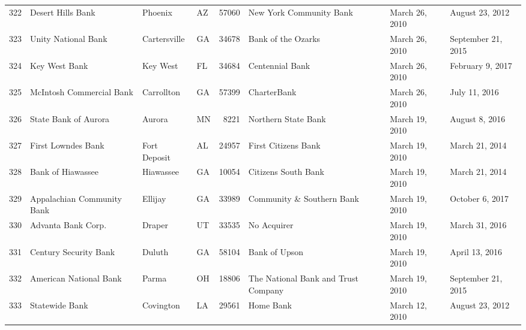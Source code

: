 \begin{tabular}{llllrlll}
322 &                                  Desert Hills Bank &             Phoenix &  AZ &  57060 &                            New York Community Bank &      March 26, 2010 &     August 23, 2012 \\
323 &                                Unity National Bank &        Cartersville &  GA &  34678 &                                 Bank of the Ozarks &      March 26, 2010 &  September 21, 2015 \\
324 &                                      Key West Bank &            Key West &  FL &  34684 &                                    Centennial Bank &      March 26, 2010 &    February 9, 2017 \\
325 &                           McIntosh Commercial Bank &          Carrollton &  GA &  57399 &                                        CharterBank &      March 26, 2010 &       July 11, 2016 \\
326 &                               State Bank of Aurora &              Aurora &  MN &   8221 &                                Northern State Bank &      March 19, 2010 &      August 8, 2016 \\
327 &                                 First Lowndes Bank &        Fort Deposit &  AL &  24957 &                                First Citizens Bank &      March 19, 2010 &      March 21, 2014 \\
328 &                                  Bank of Hiawassee &           Hiawassee &  GA &  10054 &                                Citizens South Bank &      March 19, 2010 &      March 21, 2014 \\
329 &                         Appalachian Community Bank &             Ellijay &  GA &  33989 &                          Community \& Southern Bank &      March 19, 2010 &     October 6, 2017 \\
330 &                                 Advanta Bank Corp. &              Draper &  UT &  33535 &                                        No Acquirer &      March 19, 2010 &      March 31, 2016 \\
331 &                              Century Security Bank &              Duluth &  GA &  58104 &                                      Bank of Upson &      March 19, 2010 &      April 13, 2016 \\
332 &                             American National Bank &               Parma &  OH &  18806 &                The National Bank and Trust Company &      March 19, 2010 &  September 21, 2015 \\
333 &                                     Statewide Bank &           Covington &  LA &  29561 &                                          Home Bank &      March 12, 2010 &     August 23, 2012 \\

\end{tabular}
